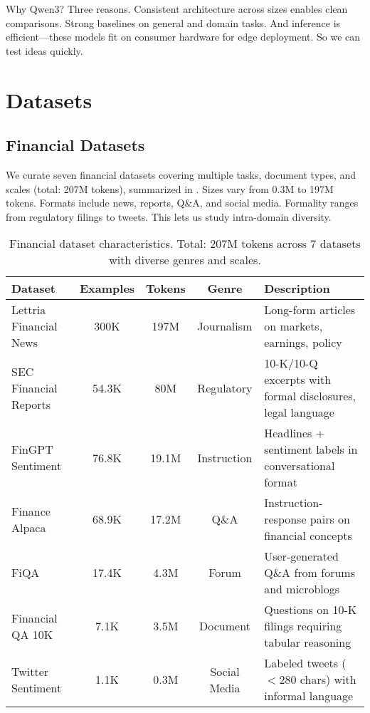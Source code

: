 Why Qwen3? Three reasons. Consistent architecture across sizes enables clean comparisons. Strong baselines on general and domain tasks. And inference is efficient—these models fit on consumer hardware for edge deployment. So we can test ideas quickly.

\section{Datasets}

\subsection{Financial Datasets}

We curate seven financial datasets covering multiple tasks, document types, and scales (total: 207M tokens), summarized in . Sizes vary from 0.3M to 197M tokens. Formats include news, reports, Q\&A, and social media. Formality ranges from regulatory filings to tweets. This lets us study intra-domain diversity.

\begin{table}[h]
\centering
\caption[Financial Dataset Characteristics]{Financial dataset characteristics. Total: 207M tokens across 7 datasets with diverse genres and scales.}
\label{tab:financial_datasets}
\small
\begin{tabular}{p{3cm}cccp{5.5cm}}
\toprule
\textbf{Dataset} & \textbf{Examples} & \textbf{Tokens} & \textbf{Genre} & \textbf{Description} \\
\midrule
Lettria Financial News & 300K & 197M & Journalism & Long-form articles on markets, earnings, policy \\
\midrule
SEC Financial Reports & 54.3K & 80M & Regulatory & 10-K/10-Q excerpts with formal disclosures, legal language \\
\midrule
FinGPT Sentiment & 76.8K & 19.1M & Instruction & Headlines + sentiment labels in conversational format \\
\midrule
Finance Alpaca & 68.9K & 17.2M & Q\&A & Instruction-response pairs on financial concepts \\
\midrule
FiQA & 17.4K & 4.3M & Forum & User-generated Q\&A from forums and microblogs \\
\midrule
Financial QA 10K & 7.1K & 3.5M & Document & Questions on 10-K filings requiring tabular reasoning \\
\midrule
Twitter Sentiment & 1.1K & 0.3M & Social Media & Labeled tweets ($<$280 chars) with informal language \\
\bottomrule
\end{tabular}
\end{table}

